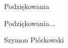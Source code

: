 \noindent
{\Large Podziękowania}
\bigskip

Podziękowania...

\bigskip

{\raggedleft
Szymon Piórkowski

}

